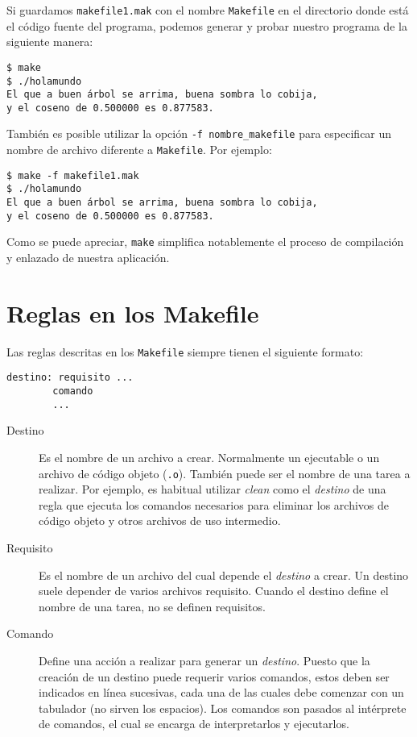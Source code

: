 Si guardamos {\tt makefile1.mak} con el nombre {\tt Makefile} en el
directorio donde está el código fuente del programa, podemos generar y
probar nuestro programa de la siguiente manera:

\begin{verbatim}
$ make
$ ./holamundo
El que a buen árbol se arrima, buena sombra lo cobija,
y el coseno de 0.500000 es 0.877583.
\end{verbatim}

También es posible utilizar la opción {\tt -f nombre\_makefile} para
especificar un nombre de archivo diferente a {\tt Makefile}. Por
ejemplo:

\begin{verbatim}
$ make -f makefile1.mak
$ ./holamundo
El que a buen árbol se arrima, buena sombra lo cobija,
y el coseno de 0.500000 es 0.877583.
\end{verbatim}

Como se puede apreciar, {\tt make} simplifica notablemente el proceso de
compilación y enlazado de nuestra aplicación.


\section{Reglas en los Makefile}

Las reglas descritas en los {\tt Makefile} siempre tienen el siguiente
formato:

\begin{verbatim}
destino: requisito ...
        comando
        ...
\end{verbatim}

\begin{description}

\item[Destino] Es el nombre de un archivo a crear. Normalmente un
ejecutable o un archivo de código objeto ({\tt *.o}). También puede ser
el nombre de una tarea a realizar. Por ejemplo, es habitual utilizar
{\em clean} como el {\em destino} de una regla que ejecuta los comandos
necesarios para eliminar los archivos de código objeto y otros archivos
de uso intermedio.

\item[Requisito] Es el nombre de un archivo del cual depende el
{\em destino} a crear. Un destino suele depender de varios archivos
requisito. Cuando el destino define el nombre de una tarea, no se
definen requisitos.

\item[Comando] Define una acción a realizar para generar un {\em
destino}. Puesto que la creación de un destino puede requerir varios
comandos, estos deben ser indicados en línea sucesivas, cada una de las
cuales debe comenzar con un tabulador (no sirven los espacios). Los
comandos son pasados al intérprete de comandos, el cual se encarga de
interpretarlos y ejecutarlos.

\end{description}

